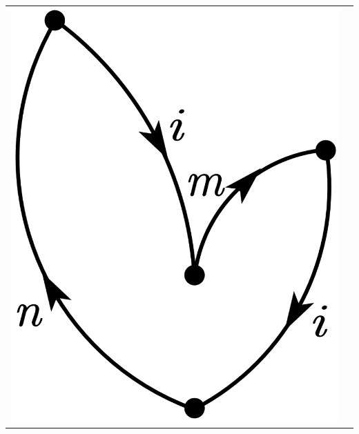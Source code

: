 \documentclass[a4paper]{book}
\newcounter{solution}[chapter]
\begin{document}
\begin{solution}
\begin{center}
\begin{tabular}{cc}
		\begin{minipage}{0.42\linewidth}
		\centering
		\includegraphics[scale=1.0,trim=0 -4 0 -4]{./pictures/6.02/6.png}
		\captionof*{figure}{$(-1)^{2+1} { \sum_{mn} }^\prime \frac{ V_{in} V_{ni} V_{im} V_{mi} }{ ( 2E^{(0)}_i - E^{(0)}_m - E^{(0)}_n ) ( E^{(0)}_i - E^{(0)}_n )^2 }$}
		\end{minipage} 
				
	\end{tabular}
	\label{fig:exe2}
	\end{center}
	

\end{solution}
\end{document}
